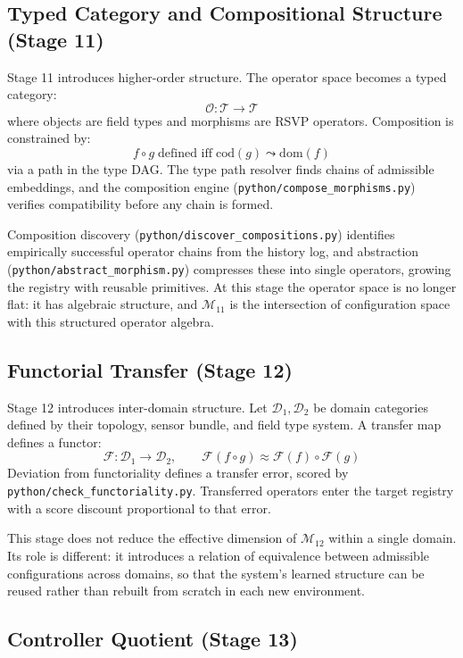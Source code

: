 \documentclass[11pt, oneside]{article}
\begin{document}
\subsection{Typed Category and Compositional Structure (Stage 11)}

Stage 11 introduces higher-order structure. The operator space becomes a typed category:
\[
\mathcal{O} : \mathcal{T} \to \mathcal{T}
\]
where objects are field types and morphisms are RSVP operators. Composition is
constrained by:
\[
f \circ g \;\text{defined iff}\; \mathrm{cod}(g) \leadsto \mathrm{dom}(f)
\]
via a path in the type DAG. The type path resolver finds chains of admissible embeddings,
and the composition engine (\texttt{python/compose\_morphisms.py}) verifies compatibility
before any chain is formed.

Composition discovery (\texttt{python/discover\_compositions.py}) identifies empirically
successful operator chains from the history log, and abstraction
(\texttt{python/abstract\_morphism.py}) compresses these into single operators, growing
the registry with reusable primitives. At this stage the operator space is no longer
flat: it has algebraic structure, and $\mathcal{M}_{11}$ is the intersection of
configuration space with this structured operator algebra.

\subsection{Functorial Transfer (Stage 12)}

Stage 12 introduces inter-domain structure. Let $\mathcal{D}_1, \mathcal{D}_2$ be
domain categories defined by their topology, sensor bundle, and field type system. A
transfer map defines a functor:
\[
\mathcal{F} : \mathcal{D}_1 \to \mathcal{D}_2, \qquad
\mathcal{F}(f \circ g) \approx \mathcal{F}(f) \circ \mathcal{F}(g)
\]
Deviation from functoriality defines a transfer error, scored by
\texttt{python/check\_functoriality.py}. Transferred operators enter the target registry
with a score discount proportional to that error.

This stage does not reduce the effective dimension of $\mathcal{M}_{12}$ within a single
domain. Its role is different: it introduces a relation of equivalence between admissible
configurations across domains, so that the system's learned structure can be reused
rather than rebuilt from scratch in each new environment.

\subsection{Controller Quotient (Stage 13)}
\end{document}
